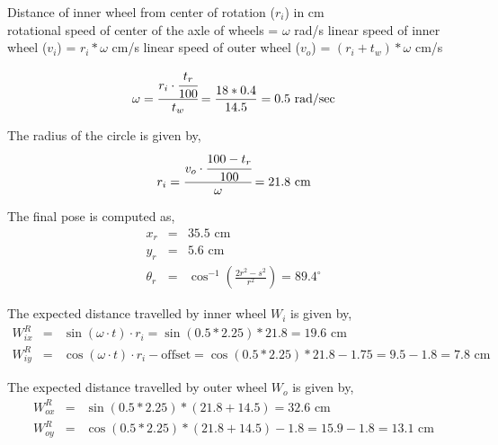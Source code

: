 \begin{enumerate}
		
	Distance of inner wheel from center of rotation ($r_i$) in cm \\ 
	rotational speed of center of the axle of wheels = $\omega$ rad/s \newline
	linear speed of inner wheel ($v_i$) = $r_i * \omega$ cm/s \newline
	linear speed of outer wheel ($v_o$) = $(r_i + t_w ) * \omega$ cm/s \newline
	
	\begin{equation}
	\omega = \cfrac{r_i \cdot \cfrac{t_r}{100}}{t_w} = \frac{18 * 0.4}{14.5} = 0.5 \text{ rad/sec}
	\end{equation}
	
	The radius of the circle is given by,
	\begin{equation}
	r_i = \cfrac{v_o \cdot \cfrac{100 - t_r}{100}}{\omega} = 21.8 \text{ cm}
	\end{equation}
	
	The final pose is computed as,
	\begin{equation}
	\begin{array}{rcl}
	x_r &=& 35.5 \text{ cm} \\
	y_r &=& 5.6 \text{ cm} \\
	\theta_r &=& \cos^{-1}\left(\frac{2r^2 - s^2}{r^2}\right) = 89.4^{\circ}
	\end{array}
	\end{equation}
	
	The expected distance travelled by inner wheel $W_i$ is given by,
	\begin{equation}
	\begin{array}{rcl}
	W^R_{ix} &=& \sin(\omega \cdot t) \cdot r_i = \sin(0.5 * 2.25) * 21.8 = 19.6 \text{ cm} \\
	W^R_{iy} &=& \cos(\omega \cdot t) \cdot r_i - \text{offset} =  \cos(0.5 * 2.25) * 21.8 - 1.75 = 9.5 - 1.8 = 7.8 \text{ cm}
	\end{array}
	\end{equation}
	
	The expected distance travelled by outer wheel $W_o$ is given by,
	\begin{equation}
	\begin{array}{rcl}
	W^R_{ox} &=& \sin(0.5 * 2.25) * (21.8 + 14.5) = 32.6 \text{ cm} \\
	W^R_{oy} &=& \cos(0.5 * 2.25) * (21.8 + 14.5) - 1.8 = 15.9 - 1.8 = 13.1 \text{ cm}
	\end{array}
	\end{equation}
	

\end{enumerate}
